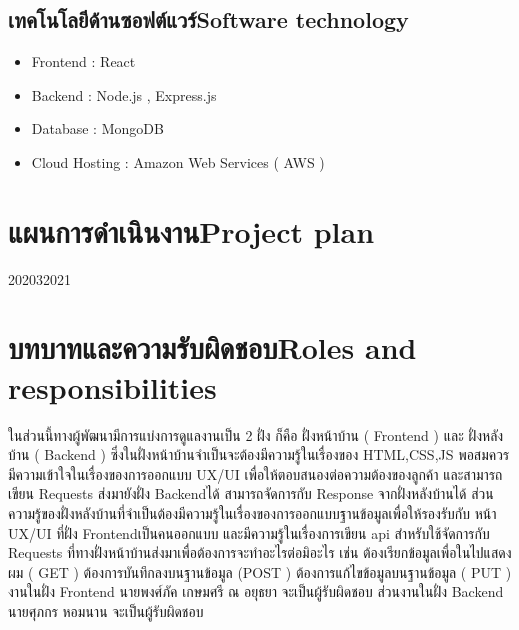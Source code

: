 \subsection{\ifcpe เทคโนโลยีด้านซอฟต์แวร์\else Software technology\fi}
\begin{itemize}
    \item Frontend : React 	
    \item Backend : Node.js , Express.js 
    \item Database : MongoDB
    \item Cloud Hosting : Amazon Web Services ( AWS )
\end{itemize}



\section{\ifcpe แผนการดำเนินงาน\else Project plan\fi}

\begin{plan}{6}{2020}{3}{2021}




\end{plan}


\section{\ifcpe บทบาทและความรับผิดชอบ\else Roles and responsibilities\fi}
ในส่วนนี้ทางผู้พัฒนามีการแบ่งการดูแลงานเป็น 2 ฝั่ง ก็คือ ฝั่งหน้าบ้าน 
( Frontend ) และ ฝั่งหลังบ้าน ( Backend ) ซึ่งในฝั่งหน้าบ้านจำเป็นจะต้องมีความรู้ในเรื่องของ HTML,CSS,JS พอสมควร มีความเข้าใจในเรื่องของการออกแบบ UX/UI เพื่อให้ตอบสนองต่อความต้องของลูกค้า และสามารถเขียน Requests ส่งมายังฝั่ง Backendได้ สามารถจัดการกับ Response จากฝั่งหลังบ้านได้ ส่วนความรู้ของฝั่งหลังบ้านที่จำเป็นต้องมีความรู้ในเรื่องของการออกแบบฐานข้อมูลเพื่อให้รองรับกับ หน้า UX/UI ที่ฝั่ง Frontendเป็นคนออกแบบ และมีความรู้ในเรื่องการเขียน api สำหรับใช้จัดการกับ Requests ที่ทางฝั่งหน้าบ้านส่งมาเพื่อต้องการจะทำอะไรต่อมิอะไร เช่น ต้องเรียกข้อมูลเพื่อในไปแสดงผม ( GET )
ต้องการบันทึกลงบนฐานข้อมูล (POST ) ต้องการแก้ไขข้อมูลบนฐานข้อมูล ( PUT )
งานในฝั่ง Frontend นายพงศ์ภัค เกษมศรี ณ อยุธยา จะเป็นผู้รับผิดชอบ 
ส่วนงานในฝั่ง Backend นายศุภกร หอมนาน  จะเป็นผู้รับผิดชอบ


